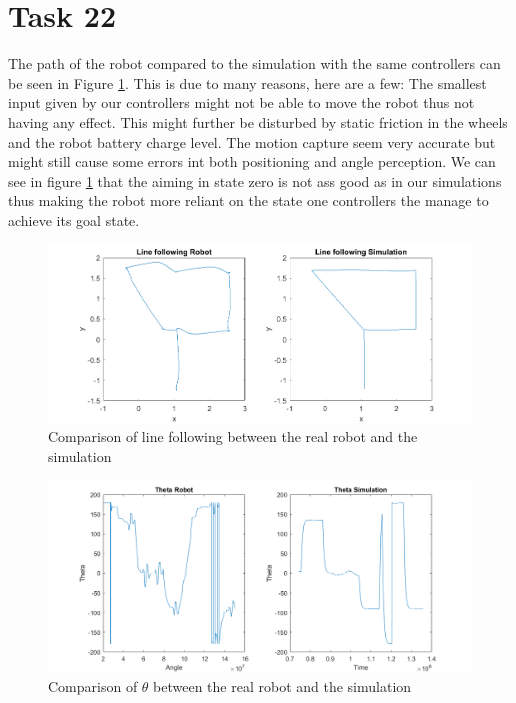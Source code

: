 \documentclass[a4paper,12pt,oneside,onecolumn]{article} %
\begin{document}
\section*{Task 22}

The path of the robot compared to the simulation with the same controllers can be seen in Figure \ref{compare}. This is due to many reasons, here are a few: The smallest input given by our controllers might not be able to move the robot thus not having any effect. This might further be disturbed by static friction in the wheels and the robot battery charge level. The motion capture seem very accurate but might still cause some errors int both positioning and angle perception. We can see in figure \ref{compare} that the aiming in state zero is not ass good as in our simulations thus making the robot more reliant on the state one controllers the manage to achieve its goal state. 

\begin{figure}[H]
	\begin{center}
	\includegraphics[scale=0.5]{task22.png}
	\caption{Comparison of line following between the real robot and the simulation}
	\label{compare}
	\end{center}
\end{figure}


\begin{figure}[H]
	\begin{center}
	\includegraphics[scale=0.5]{task22angle.png}
	\caption{Comparison of  $\theta$ between the real robot and the simulation}
	\label{compareangle}
	\end{center}
\end{figure}
\end{document}
